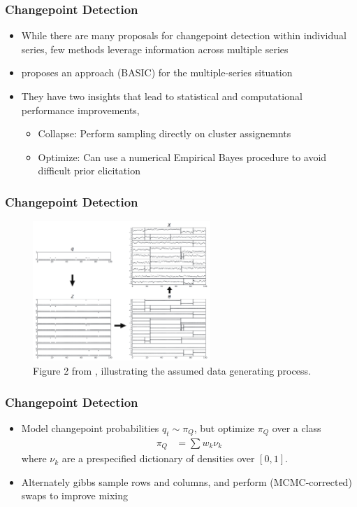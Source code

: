 \documentclass{beamer}
\begin{document}
\begin{frame}
  \frametitle{Changepoint Detection}
  \begin{itemize}
  \item While there are many proposals for changepoint detection within
    individual series, few methods leverage information across multiple series
  \item \citep{fan2015empirical} proposes an approach (BASIC) for the
    multiple-series situation
  \item They have two insights that lead to statistical and computational
    performance improvements,
    \begin{itemize}
    \item Collapse: Perform sampling directly on cluster assignemnts
    \item Optimize: Can use a numerical Empirical Bayes procedure to avoid
      difficult prior elicitation
    \end{itemize}
  \end{itemize}
\end{frame}

\begin{frame}
  \frametitle{Changepoint Detection}
\begin{figure}[ht]
  \centering
  \includegraphics[width=0.6\textwidth]{figure/basic_model}
  \caption{Figure 2 from \citep{fan2015empirical}, illustrating the assumed data
    generating process. \label{fig:basic_model} }
\end{figure}
\end{frame}

\begin{frame}
  \frametitle{Changepoint Detection}
  \begin{itemize}
  \item Model changepoint probabilities $q_{t} \sim \pi_{Q}$, but optimize $\pi_{Q}$ over a class
    \begin{align*}
      \pi_{Q} &= \sum w_{k} \nu_{k}
    \end{align*}
    where $\nu_{k}$ are a prespecified dictionary of densities over $\left[0,
      1\right]$.
  \item Alternately gibbs sample rows and columns, and perform (MCMC-corrected)
    swaps to improve mixing
  \end{itemize}
\end{frame}
\end{document}
